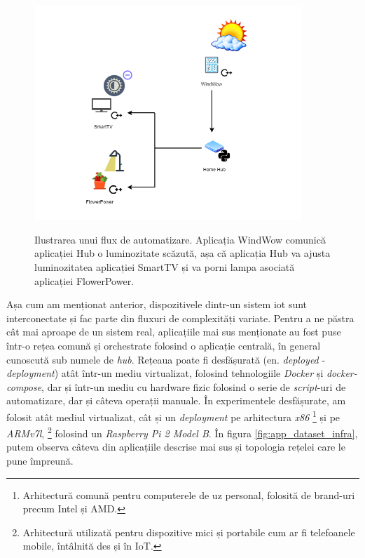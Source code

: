 \begin{figure}[h]
    \centering
    \caption{\centering Ilustrarea unui flux de automatizare. Aplicația WindWow comunică aplicației Hub o luminozitate scăzută, așa că aplicația Hub va ajusta luminozitatea aplicației SmartTV și va porni lampa asociată aplicației FlowerPower.}
    \includegraphics[width=0.9\textwidth]{images/smarthome_automation.drawio (2).png}
    \label{fig:app_flux}
\end{figure}

Așa cum am menționat anterior, dispozitivele dintr-un sistem \acrshort{iot} sunt interconectate și fac parte din fluxuri de complexități variate. Pentru a ne păstra cât mai aproape de un sistem real, aplicațiile mai sus menționate au fost puse într-o rețea comună și orchestrate folosind o aplicație centrală, în general cunoscută sub numele de \textit{hub}. Rețeaua poate fi desfășurată (en. \textit{deployed} - \textit{deployment}) atât într-un mediu virtualizat, folosind tehnologiile \textit{Docker} și \textit{docker-compose}, dar și într-un mediu cu hardware fizic folosind o serie de \textit{script}-uri de automatizare, dar și câteva operații manuale. În experimentele desfășurate, am folosit atât mediul virtualizat, cât și un \textit{deployment} pe arhitectura \textit{x86} \footnote{Arhitectură comună pentru computerele de uz personal, folosită de brand-uri precum Intel și AMD.} și pe \textit{ARMv7l}, \footnote{Arhitectură utilizată pentru dispozitive mici și portabile cum ar fi telefoanele mobile, întâlnită des și în IoT.} folosind un \textit{Raspberry Pi 2 Model B}. În figura \ref{fig:app_dataset_infra}, putem observa câteva din aplicațiile descrise mai sus și topologia rețelei care le pune împreună.

